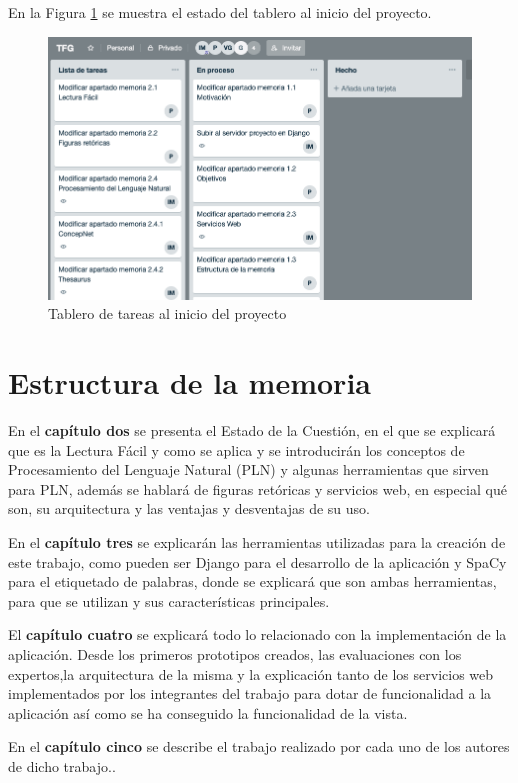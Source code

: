 En la Figura \ref{fig:trello} se muestra el estado del tablero al inicio del proyecto.
\begin{figure}[!h]
	\includegraphics[width=1.0\textwidth]{Imagenes/Bitmap/Capitulo1/trello.png}
	\caption{Tablero de tareas al inicio del proyecto}
	\label{fig:trello}
\end{figure}


\section{Estructura de la memoria}
\label{cap:sec:estructuramemoria}


En el \textbf{capítulo dos} se presenta el Estado de la Cuestión, en el que se explicará que es la Lectura Fácil y como se aplica y se introducirán los conceptos de Procesamiento del Lenguaje Natural (PLN) y algunas herramientas que sirven para PLN, además se hablará de figuras retóricas y servicios web, en especial qué son, su arquitectura y las ventajas y desventajas de su uso.


En el \textbf{capítulo tres} se explicarán las herramientas utilizadas para la creación de este trabajo, como pueden ser Django para el desarrollo de la aplicación y SpaCy para el etiquetado de palabras, donde se explicará que son ambas herramientas, para que se utilizan y sus características principales.

El \textbf{capítulo cuatro} se explicará todo lo relacionado con la implementación de la aplicación. Desde los primeros prototipos creados, las evaluaciones con los expertos,la arquitectura de la misma y la explicación tanto de los servicios web implementados por los integrantes del trabajo para dotar de funcionalidad a la aplicación así como se ha conseguido la funcionalidad de la vista. 

 
En el \textbf{capítulo cinco} se describe el trabajo realizado por cada uno de los autores de dicho trabajo..